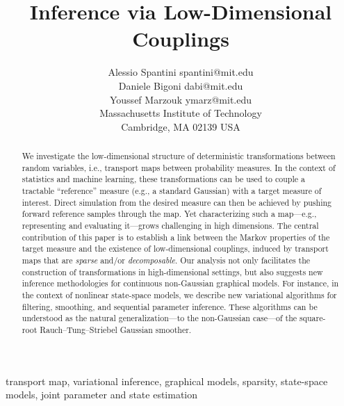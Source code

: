 \documentclass[twoside,11pt]{article}
\begin{document}
\title{Inference via Low-Dimensional Couplings}

\author{\name Alessio Spantini \email spantini@mit.edu \\
        \name Daniele Bigoni \email dabi@mit.edu \\
        \name Youssef Marzouk \email ymarz@mit.edu \\
       \addr %
       Massachusetts Institute of Technology\\
       Cambridge, MA 02139 USA}


\maketitle

\begin{abstract}%
%
We investigate the low-dimensional structure of deterministic
transformations between random variables, i.e., transport maps between
probability measures. 
%
%
In the context of statistics and machine learning, these
transformations can be used to couple a tractable ``reference''
measure (e.g., a standard Gaussian) with a target measure of
interest.
%
%
Direct simulation from the desired measure can then be achieved by %
pushing forward reference samples through the map. %
Yet characterizing such a map---e.g., representing and evaluating it---grows challenging in high dimensions.
%
The central contribution of this paper is to establish a link between
the Markov properties of the target measure %
%
and the existence of low-dimensional couplings, induced by transport maps
that are \textit{sparse} and/or \textit{decomposable}.  Our analysis
not only facilitates the construction of transformations in
high-dimensional settings, but also suggests new inference
methodologies for continuous non-Gaussian graphical models.  For
instance, in the context of nonlinear state-space models, we describe
new variational algorithms for filtering, smoothing, and sequential
parameter inference.
%
These algorithms can be understood as the natural
generalization---to the non-Gaussian
case---of the square-root
Rauch--Tung--Striebel Gaussian smoother.
\end{abstract}

\begin{keywords}
  transport map, 
  variational inference,
  graphical models,
  sparsity,
  state-space models,
  joint parameter and state estimation
\end{keywords}
\end{document}
